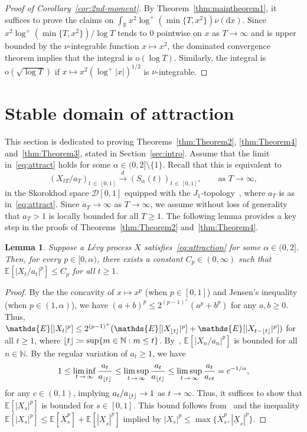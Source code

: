 \documentclass[10pt]{amsart}
\newtheorem{lemm}[theo]{Lemma}\newtheorem{prop}[theo]{Proposition}\newtheorem{coro}[theo]{Corollary}\newtheorem{conj}[theo]{Conjecture}
\theoremstyle{definition}\newtheorem{defi}[theo]{Definition}\newtheorem{rema}[theo]{Remark}\newtheorem{exam}[theo]{Example}\newtheorem{exem}[theo]{Example}\newtheorem{nota}[theo]{Notation}
\DeclarePairedDelimiter\floor{\lfloor}{\rfloor}
\newcommand\N{\mathbb{N}}
\newcommand\R{\mathbb{R}}
\newcommand\E{\mathds{E}}
\newcommand\1{\mathds{1}}
\newcommand\D{\mathrm{d}}
\newcommand\oh{\mathrm{o}}
\newcommand{\calD}{\mathcal{D}}
\newcommand\cid{\xrightarrow{d}}
\newcommand\ov[1]{\overline{#1}}
\newcommand\un[1]{\underline{#1}}
\begin{document}
\begin{proof}[Proof of Corollary~\ref{cor:2nd-moment}]
By Theorem~\ref{thm:maintheorem1}, it suffices to prove the claims on $\int_\R x^2\log^+(\min\{T, x^2\})\nu(\D x)$. Since $x^2\log^+(\min\{T, x^2\})/\log T$ tends to $0$ pointwise on $x$ as $T\to\infty$ and is upper bounded by the $\nu$-integrable function $x\mapsto x^2$, the dominated convergence theorem implies that the integral is $\oh(\log T)$. Similarly, the integral is $\oh(\sqrt{\log T})$ if $x\mapsto x^2(\log^+|x|)^{1/2}$ is $\nu$-integrable.
\end{proof}

\section{Stable domain of attraction}\label{sec:stable_domain}
This section is dedicated to proving Theorems~\ref{thm:Theorem2}, \ref{thm:Theorem4} and~\ref{thm:Theorem3}, stated in Section~\ref{sec:intro}. Assume that the limit in~\eqref{eq:attract} holds for some $\alpha\in(0,2]\setminus\{1\}$. Recall that this is equivalent to
\begin{equation}\label{eq:attraction}
\left(X_{tT}/a_T\right)_{t\,\in\,[0,1]}
\cid \left(S_\alpha(t)\right)_{t\,\in\,[0,1]},
\qquad\text{as }T\to\infty,
\end{equation}
in the Skorokhod space $\calD[0,1]$ equipped with the $J_1$-topology~\cite[Chapter~3]{BillingsleyConvergence}, where $a_T$ is as in~\eqref{eq:attract}. Since $a_T\to\infty$ as $T\to\infty$, we assume without loss of generality that $a_T>1$ is locally bounded for all $T\ge 1$. The following lemma provides a key step in the proofs of Theorems~\ref{thm:Theorem2} and~\ref{thm:Theorem4}.

\begin{lemm}\label{lem:stable_mom}
Suppose a Lévy process $X$ satisfies~\eqref{eq:attraction} for some $\alpha\in(0,2]$. Then, for every $p\in[0,\alpha)$, there exists a constant $C_p\in(0,\infty)$ such that $\E[|X_t/a_t|^p]\le C_p$ for all $t\ge 1$.
\end{lemm}

\begin{proof}
By the the concavity of $x\mapsto x^p$ (when $p\in[0, 1]$) and Jensen's inequality (when $p\in(1,\alpha)$), we have $(a+b)^p\le 2^{(p-1)^+}(a^p+b^p)$ for any $a,b\ge 0$. Thus, $\E[|X_t|^p]\le 2^{(p-1)^+}(\E[|X_{\floor{t}}|^p]+\E[|X_{t-\floor{t}}|^p])$ for all $t\ge 1$, where $\floor{t}\coloneqq \sup\{m\in\N:m\le t\}$. By~\cite[Lemma~5.2.2]{IbragimovLinnikBook}, $\E[|X_n/a_n|^p]$ is bounded for all $n\in\N$. By the regular variation of $a_t\ge 1$, we have
\[
1\le\liminf_{t\,\to\,\infty}\frac{a_t}{a_{\floor{t}}}
\le\limsup_{t\,\to\,\infty}\frac{a_t}{a_{\floor{t}}}
\le\limsup_{t\,\to\,\infty}\frac{a_t}{a_{ct}}=c^{-1/\alpha},
\]
for any $c\in(0,1)$, implying $a_t/a_{\floor{t}}\to 1$ as $t\to\infty$. Thus, it suffices to show that $\E[|X_s|^p]$ is bounded for $s\in[0,1]$. This bound follows from~\cite[Lemma~2]{LevySupSim} and the inequality $\E[|X_s|^p]\le\E[\ov{X}_s^p] +\E[|\un{X}_s|^p]$ implied by $|X_s|^p\leq \max\{\ov{X}_s^p,|\un{X}_s|^p\}$.
\end{proof}
\end{document}
